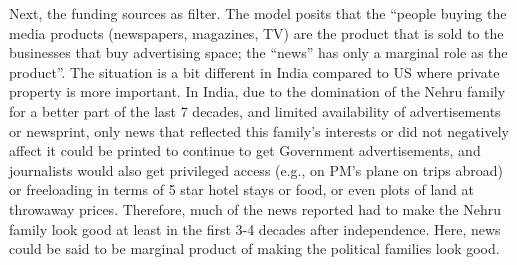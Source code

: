 Next, the funding sources as filter. The model posits that the “people buying the media products (newspapers, magazines, TV) are the product that is sold to the businesses that buy advertising space; the “news” has only a marginal role as the product”. The situation is a bit different in India compared to US where private property is more important.  In India, due to the domination of the Nehru family for a better part of the last 7 decades, and limited availability of advertisements or newsprint, only news that reflected this family’s interests or did not negatively affect it could be printed to continue to get Government advertisements, and journalists would also get privileged access (e.g., on PM’s plane on trips abroad) or freeloading in terms of 5 star hotel stays or food, or even plots of land at throwaway prices. Therefore, much of the news reported had to make the Nehru family look good at least in the first 3-4 decades after independence. Here, news could be said to be marginal product of making the political families look good.

